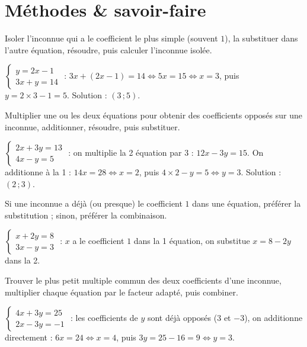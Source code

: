 \section{Méthodes \& savoir-faire}

Isoler l'inconnue qui a le coefficient le plus simple (souvent $1$), la substituer dans
l'autre équation, résoudre, puis calculer l'inconnue isolée.
\begin{exemple}
$\left\{\begin{array}{l}y=2x-1\\3x+y=14\end{array}\right.$ : $3x+(2x-1)=14\iff5x=15\iff x=3$,
puis $y=2\times3-1=5$. Solution : $(3\,;5)$.
\end{exemple}

Multiplier une ou les deux équations pour obtenir des coefficients opposés sur une inconnue,
additionner, résoudre, puis substituer.
\begin{exemple}
$\left\{\begin{array}{l}2x+3y=13\\4x-y=5\end{array}\right.$ : on multiplie la 2\ieme{}
équation par $3$ : $12x-3y=15$. On additionne à la 1\iere{} : $14x=28\iff x=2$, puis
$4\times2-y=5\iff y=3$. Solution : $(2\,;3)$.
\end{exemple}

Si une inconnue a déjà (ou presque) le coefficient $1$ dans une équation, préférer la
substitution ; sinon, préférer la combinaison.
\begin{exemple}
$\left\{\begin{array}{l}x+2y=8\\3x-y=3\end{array}\right.$ : $x$ a le coefficient $1$ dans
la 1\iere{} équation, on substitue $x=8-2y$ dans la 2\ieme{}.
\end{exemple}

Trouver le plus petit multiple commun des deux coefficients d'une inconnue, multiplier
chaque équation par le facteur adapté, puis combiner.
\begin{exemple}
$\left\{\begin{array}{l}4x+3y=25\\2x-3y=-1\end{array}\right.$ : les coefficients de $y$
sont déjà opposés ($3$ et $-3$), on additionne directement : $6x=24\iff x=4$, puis
$3y=25-16=9\iff y=3$.
\end{exemple}

